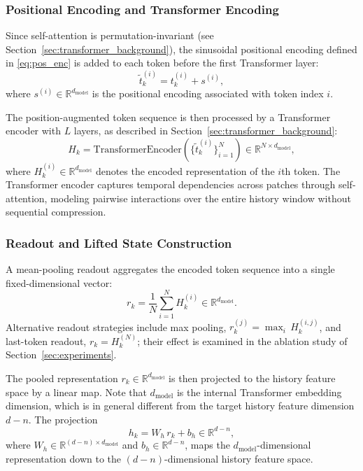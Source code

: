 \documentclass[journal]{IEEEtran}
\begin{document}
\subsubsection{Positional Encoding and Transformer Encoding}

Since self-attention is permutation-invariant (see Section~\ref{sec:transformer_background}), the sinusoidal positional encoding defined in \eqref{eq:pos_enc} is added to each token before the first Transformer layer:
\begin{equation}
    \tilde{t}_k^{(i)} = t_k^{(i)} + s^{(i)},
    \label{eq:pos_enc_applied}
\end{equation}
where $s^{(i)} \in \mathbb{R}^{d_{\mathrm{model}}}$ is the positional encoding associated with token index $i$.

The position-augmented token sequence is then processed by a Transformer encoder with $L$ layers, as described in Section~\ref{sec:transformer_background}:
\begin{equation}
    H_k = \mathrm{TransformerEncoder}\!\left(
        \bigl\{\tilde{t}_k^{(i)}\bigr\}_{i=1}^N
    \right) \in \mathbb{R}^{N \times d_{\mathrm{model}}},
    \label{eq:transformer_enc}
\end{equation}
where $H_k^{(i)} \in \mathbb{R}^{d_{\mathrm{model}}}$ denotes the encoded representation of the $i$th token. The Transformer encoder captures temporal dependencies across patches through self-attention, modeling pairwise interactions over the entire history window without sequential compression.

\subsubsection{Readout and Lifted State Construction}

A mean-pooling readout aggregates the encoded token sequence into a single fixed-dimensional vector:
\begin{equation}
    r_k = \frac{1}{N}\sum_{i=1}^{N} H_k^{(i)} \in \mathbb{R}^{d_{\mathrm{model}}}.
    \label{eq:pooling}
\end{equation}
Alternative readout strategies include max pooling, $r_k^{(j)} = \max_i\, H_k^{(i,j)}$, and last-token readout, $r_k = H_k^{(N)}$; their effect is examined in the ablation study of Section~\ref{sec:experiments}.

The pooled representation $r_k \in \mathbb{R}^{d_{\mathrm{model}}}$ is then projected to the history feature space by a linear map. Note that $d_{\mathrm{model}}$ is the internal Transformer embedding dimension, which is in general different from the target history feature dimension $d - n$. The projection
\begin{equation}
    h_k = W_h\, r_k + b_h \in \mathbb{R}^{d-n},
    \label{eq:history_feature}
\end{equation}
where $W_h \in \mathbb{R}^{(d-n) \times d_{\mathrm{model}}}$ and $b_h \in \mathbb{R}^{d-n}$, maps the $d_{\mathrm{model}}$-dimensional representation down to the $(d-n)$-dimensional history feature space.
\end{document}
